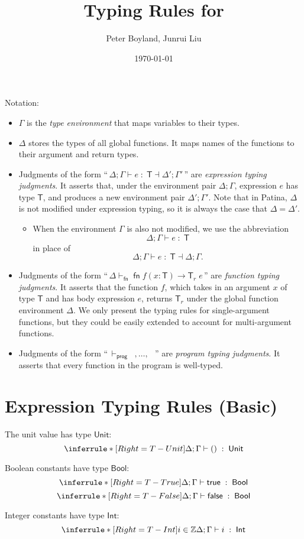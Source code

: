 \documentclass{article}
\title{Typing Rules for \toolname}
\author{Peter Boyland, Junrui Liu}
\date{\today}
\newcommand{\toolname}{{\sc Patina}\xspace}
\newcommand{\fenv}{{\Delta}\xspace}
\newcommand{\tenv}{{\Gamma}\xspace}
\newcommand{\booltype}{{\mathsf{Bool}}\xspace}
\newcommand{\inttype}{{\mathsf{Int}}\xspace}
\newcommand{\unittype}{{\mathsf{Unit}}\xspace}
\newcommand{\type}{{\mathsf{T}}\xspace}
\newcommand{\tval}[3]{#1 \vdash #2 \;:\; #3}
\newcommand{\tfn}[2]{#1 \vdash_{\msf{fn}} #2}
\newcommand{\tprog}[1]{\vdash_{\msf{prog}} #1}
\newcommand{\tseq}[4]{#1 \vdash #2 \;:\; #3 \dashv #4}
\newcommand{\msf}[1]{\mathop{\mathsf{#1}}}
\newcommand{\efn}[4]{\msf{fn} #1 (#2) \to #3 \; #4}
\newcommand{\envs}[0]{\fenv;\tenv}
\newcommand{\truleTrue}{
  \inferrule*[Right=T-True]{ }{\tval{\envs}{\msf{true}}{\booltype}}
}
\newcommand{\truleFalse}{
  \inferrule*[Right=T-False]{ }{\tval{\envs}{\msf{false}}{\booltype}}
}
\newcommand{\truleInt}{
  \inferrule*[Right=T-Int]{i \in \mathbb{Z}}{\tval{\envs}{i}{\inttype}}
}
\newcommand{\truleUnit}{
  \inferrule*[Right=T-Unit]{ }{\tval{\envs}{\msf{()}}{\unittype}}
}
\begin{document}
\maketitle

Notation:
\begin{itemize}
  \item
  $\tenv$ is the {\it type environment} that maps variables to their types.
  \item
  $\fenv$ stores the types of all global functions. It maps names of the functions to their argument and return types.
  \item
  Judgments of the form ``\,$\tseq{\fenv;\tenv}{e}{\type}{\fenv';\tenv'}\,$'' are {\it expression typing judgments}. It asserts that, under the environment pair $\fenv;\tenv$, expression $e$ has type $\type$, and produces a new environment pair $\fenv';\tenv'$. Note that in \toolname, $\fenv$ is not modified under expression typing, so it is always the case that $\fenv = \fenv'$.
  \begin{itemize}
    \item When the environment $\tenv$ is also not modified, we use the abbreviation $$\tval{\envs}{e}{\type}$$ in place of $$\tseq{\envs}{e}{\type}{\envs}.$$
  \end{itemize}
  \item 
  Judgments of the form ``$\,\tfn{\fenv}{\efn{f}{x: \type}{\type_r}{e}}\,$'' are {\it function typing judgments}. It asserts that the function $f$, which takes in an argument $x$ of type $\type$ and has body expression $e$, returns $\type_r$ under the global function environment $\fenv$.  We only present the typing rules for single-argument functions, but they could be easily extended to account for multi-argument functions.
  \item
  Judgments of the form ``$\,\tprog{\msf{fn_1}, \ldots, \msf{fn_n}}\,$'' are {\it program typing judgments}. It asserts that every function in the program is well-typed.
\end{itemize}

\section{Expression Typing Rules (Basic)}

The unit value has type $\unittype$:
$$\truleUnit$$

Boolean constants have type $\booltype$:
$$\truleTrue$$
$$\truleFalse$$

Integer constants have type $\inttype$:
$$\truleInt$$
\end{document}
